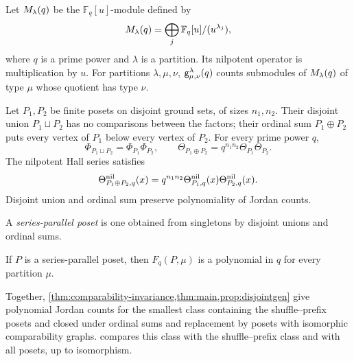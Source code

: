 \begin{definition}
\label{def:hall-counts}
{Let $M_{\lambda}(q)$ be the $\mathbb F_q[u]$-module defined by
\[
 M_{\lambda}(q)=\bigoplus_j\mathbb F_q[u]/(u^{\lambda_j}),
\]
where $q$ is a prime power and $\lambda$ is a partition. Its nilpotent operator
is multiplication by $u$. For partitions $\lambda,\mu,\nu$,
$\mathsf g_{\mu,\nu}^\lambda(q)$ counts submodules of
$M_{\lambda}(q)$ of type $\mu$
whose quotient has type $\nu$.}
\end{definition}

\begin{theorem}
\label{prop:disjointgen}\label{lem:ordinalgen}
Let $P_1,P_2$ be finite posets on disjoint ground sets, of sizes $n_1,n_2$.
Their disjoint union $P_1{\sqcup}P_2$ has no comparisons between the factors;
their ordinal sum $P_1\oplus P_2$ puts every vertex of $P_1$ below
every vertex of $P_2$. For every prime power $q$,
\begin{equation}
 \Phi_{P_1{\sqcup}P_2}=\Phi_{P_1}\Phi_{P_2},\qquad
 \Theta_{P_1\oplus P_2}=q^{n_1n_2}\Theta_{P_1}\Theta_{P_2}.
 \label{eq:phi-product}
\end{equation}
{The nilpotent Hall series satisfies
\[
 \Theta^{\mathrm{nil}}_{P_1\oplus P_2,q}(x)
 =q^{n_1n_2}\Theta^{\mathrm{nil}}_{P_1,q}(x)\Theta^{\mathrm{nil}}_{P_2,q}(x).
\]}
{Disjoint union and ordinal sum preserve polynomiality of Jordan counts.}
\end{theorem}

{A \emph{series-parallel poset} is one obtained from
singletons by disjoint unions and ordinal sums.}

\begin{corollary}
\label{cor:series-parallel-jordan-counts}
{If $P$ is a series-parallel poset, then
$F_q(P,\mu)$ is a polynomial in $q$ for every partition $\mu$.}
\end{corollary}

{Together, \cref{thm:comparability-invariance,thm:main,prop:disjointgen}
give polynomial Jordan counts for the smallest class containing the
shuffle--prefix posets and closed under ordinal sums and replacement by
posets with isomorphic comparability graphs.
 compares this class with the
shuffle--prefix class and with all posets, up to isomorphism.}


